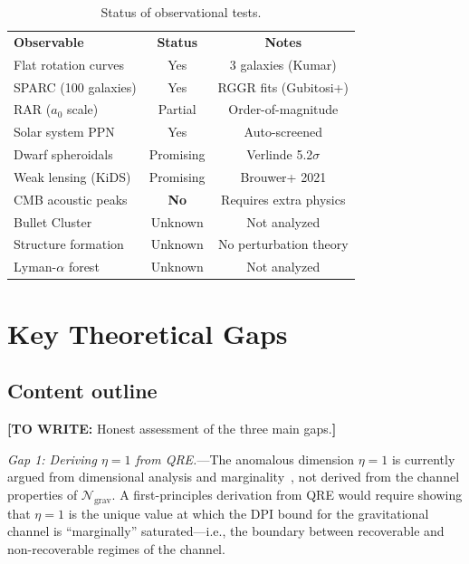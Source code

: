 \documentclass[prl,twocolumn,superscriptaddress,longbibliography,floatfix]{revtex4-2}
\newcommand{\chan}{\mathcal{N}}
\newcommand{\towrite}[1]{{\color{blue}\textbf{[TO WRITE:} #1\textbf{]}}}
\begin{document}
\begin{table}[htbp]
\caption{\label{tab:status}Status of observational tests.}
\begin{ruledtabular}
\begin{tabular}{lcc}
\textbf{Observable} & \textbf{Status} & \textbf{Notes} \\
\colrule
Flat rotation curves & Yes & 3 galaxies (Kumar) \\
SPARC (100 galaxies) & Yes & RGGR fits (Gubitosi+) \\
RAR ($a_0$ scale) & Partial & Order-of-magnitude \\
Solar system PPN & Yes & Auto-screened \\
Dwarf spheroidals & Promising & Verlinde 5.2$\sigma$ \\
Weak lensing (KiDS) & Promising & Brouwer+ 2021 \\
\colrule
CMB acoustic peaks & \textbf{No} & Requires extra physics \\
Bullet Cluster & Unknown & Not analyzed \\
Structure formation & Unknown & No perturbation theory \\
Lyman-$\alpha$ forest & Unknown & Not analyzed \\
\end{tabular}
\end{ruledtabular}
\end{table}

\section{Key Theoretical Gaps}
\label{sec:gaps}

\subsection*{Content outline}

\towrite{Honest assessment of the three main gaps.}

\emph{Gap 1: Deriving $\eta = 1$ from QRE.}---The anomalous
dimension $\eta = 1$ is currently argued from dimensional analysis
and marginality~\cite{Kumar2025}, not derived from the channel
properties of $\chan_{\mathrm{grav}}$. A first-principles
derivation from QRE would require showing that $\eta = 1$ is the
unique value at which the DPI bound for the gravitational channel
is ``marginally'' saturated---i.e., the boundary between
recoverable and non-recoverable regimes of the channel.
\end{document}
